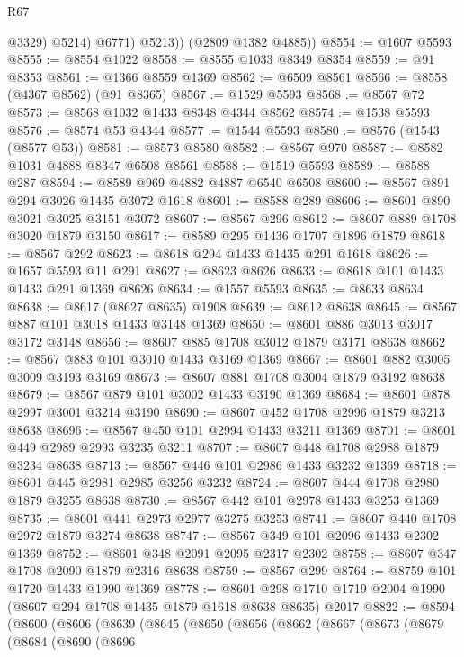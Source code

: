 \begin{lexlean}{R67}
\begin{coremodule}
                @3329)
              @5214)
            @6771)
          @5213))
      (@2809 @1382 @4885))
@8554 := @1607 @5593
@8555 := @8554 @1022
@8558 := @8555 @1033 @8349 @8354
@8559 := @91 @8353
@8561 := @1366 @8559 @1369
@8562 := @6509 @8561
@8566 := @8558 (@4367 @8562) (@91 @8365)
@8567 := @1529 @5593
@8568 := @8567 @72
@8573 := @8568 @1032 @1433 @8348 @4344 @8562
@8574 := @1538 @5593
@8576 := @8574 @53 @4344
@8577 := @1544 @5593
@8580 := @8576 (@1543 (@8577 @53))
@8581 := @8573 @8580
@8582 := @8567 @970
@8587 := @8582 @1031 @4888 @8347 @6508 @8561
@8588 := @1519 @5593
@8589 := @8588 @287
@8594 := @8589 @969 @4882 @4887 @6540 @6508
@8600 := @8567 @891 @294 @3026 @1435 @3072 @1618
@8601 := @8588 @289
@8606 := @8601 @890 @3021 @3025 @3151 @3072
@8607 := @8567 @296
@8612 := @8607 @889 @1708 @3020 @1879 @3150
@8617 := @8589 @295 @1436 @1707 @1896 @1879
@8618 := @8567 @292
@8623 := @8618 @294 @1433 @1435 @291 @1618
@8626 := @1657 @5593 @11 @291
@8627 := @8623 @8626
@8633 := @8618 @101 @1433 @1433 @291 @1369 @8626
@8634 := @1557 @5593
@8635 := @8633 @8634
@8638 := @8617 (@8627 @8635) @1908
@8639 := @8612 @8638
@8645 := @8567 @887 @101 @3018 @1433 @3148 @1369
@8650 := @8601 @886 @3013 @3017 @3172 @3148
@8656 := @8607 @885 @1708 @3012 @1879 @3171 @8638
@8662 := @8567 @883 @101 @3010 @1433 @3169 @1369
@8667 := @8601 @882 @3005 @3009 @3193 @3169
@8673 := @8607 @881 @1708 @3004 @1879 @3192 @8638
@8679 := @8567 @879 @101 @3002 @1433 @3190 @1369
@8684 := @8601 @878 @2997 @3001 @3214 @3190
@8690 := @8607 @452 @1708 @2996 @1879 @3213 @8638
@8696 := @8567 @450 @101 @2994 @1433 @3211 @1369
@8701 := @8601 @449 @2989 @2993 @3235 @3211
@8707 := @8607 @448 @1708 @2988 @1879 @3234 @8638
@8713 := @8567 @446 @101 @2986 @1433 @3232 @1369
@8718 := @8601 @445 @2981 @2985 @3256 @3232
@8724 := @8607 @444 @1708 @2980 @1879 @3255 @8638
@8730 := @8567 @442 @101 @2978 @1433 @3253 @1369
@8735 := @8601 @441 @2973 @2977 @3275 @3253
@8741 := @8607 @440 @1708 @2972 @1879 @3274 @8638
@8747 := @8567 @349 @101 @2096 @1433 @2302 @1369
@8752 := @8601 @348 @2091 @2095 @2317 @2302
@8758 := @8607 @347 @1708 @2090 @1879 @2316 @8638
@8759 := @8567 @299
@8764 := @8759 @101 @1720 @1433 @1990 @1369
@8778 := @8601 @298 @1710 @1719 @2004 @1990 (@8607 @294 @1708 @1435 @1879 @1618 @8638 @8635) @2017
@8822 := @8594
    (@8600
      (@8606
        (@8639
          (@8645
            (@8650
              (@8656
                (@8662
                  (@8667
                    (@8673
                      (@8679
                        (@8684
                          (@8690
                            (@8696

\end{coremodule}
\end{lexlean}
